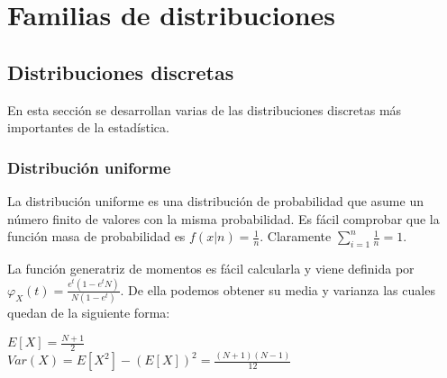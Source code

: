 \documentclass{article}
\begin{document}
\hypersetup{pageanchor=false}
\maketitle
\hypersetup{pageanchor=true}



\newpage
\tableofcontents
\vspace*{\fill}
\doclicenseThis
\newpage


\section{Familias de distribuciones}

\subsection{Distribuciones discretas}

En esta sección se desarrollan varias de las distribuciones discretas más importantes de la estadística.

    \subsubsection{Distribución uniforme}
La distribución uniforme es una distribución de probabilidad que asume un número finito de valores con la misma probabilidad. Es fácil comprobar que la función masa de probabilidad es $f(x|n) = \frac{1}{n}$. Claramente $\sum^n_{i=1} \frac{1}{n} = 1$.

La función generatriz de momentos es fácil calcularla y viene definida por $\varphi_X(t) = \frac{e^t (1 - e^tN)}{N(1-e^t)}$. De ella podemos obtener su media y varianza las cuales quedan de la siguiente forma:

\begin{center}
	$E[X] = \frac{N+1}{2}$
	\\$Var(X) =  E[X^2] - (E[X])^2 =  \frac{(N+1)(N-1)}{12}$
\end{center}
\end{document}
